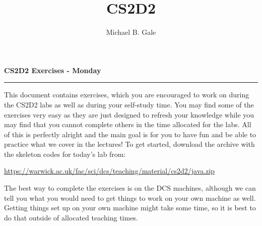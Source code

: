 \documentclass[]{uow-exercises}
\author{Michael B. Gale}
\title{CS2D2}
\begin{document}
\pagestyle{fancy}
\thispagestyle{fancy}

\begin{center}
    \textbf{\LARGE CS2D2 Exercises - Monday}
\end{center} \hrule \vspace{0.5cm}

This document contains exercises, which you are encouraged to work on during the CS2D2 labs as well as during your self-study time. You may find some of the exercises very easy as they are just designed to refresh your knowledge while you may find that you cannot complete others in the time allocated for the labs. All of this is perfectly alright and the main goal is for you to have fun and be able to practice what we cover in the lectures!
To get started, download the archive with the skeleton codes for today's lab from:
\begin{center}\small
    \url{https://warwick.ac.uk/fac/sci/dcs/teaching/material/cs2d2/java.zip}
\end{center}

The best way to complete the exercises is on the DCS machines, although we can tell you what you would need to get things to work on your own machine as well. Getting things set up on your own machine might take some time, so it is best to do that outside of allocated teaching times.


	
\end{document}
